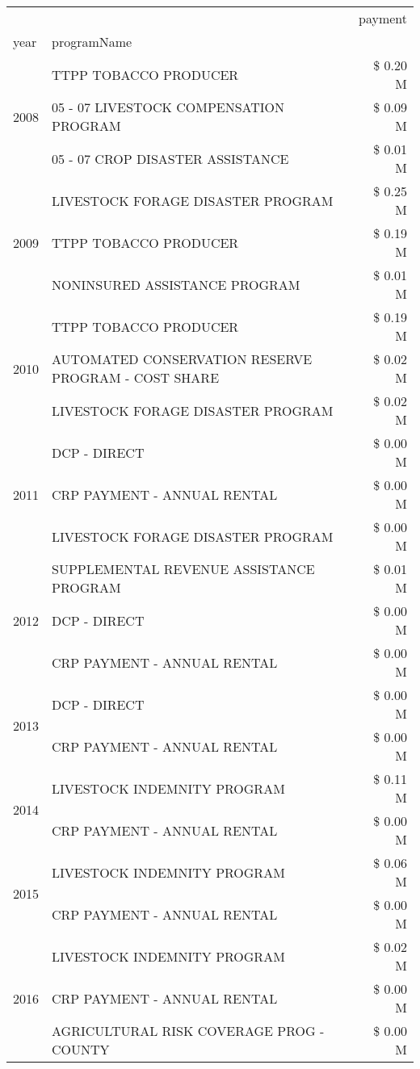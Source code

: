 \begin{tabular}{llr}
\toprule
 &  & payment \\
year & programName &  \\
\midrule
\multirow[t]{3}{*}{2008} & TTPP TOBACCO PRODUCER & \$ 0.20 M \\
 & 05 - 07 LIVESTOCK COMPENSATION PROGRAM & \$ 0.09 M \\
 & 05 - 07 CROP DISASTER ASSISTANCE & \$ 0.01 M \\
\cline{1-3}
\multirow[t]{3}{*}{2009} & LIVESTOCK FORAGE DISASTER  PROGRAM & \$ 0.25 M \\
 & TTPP TOBACCO PRODUCER & \$ 0.19 M \\
 & NONINSURED ASSISTANCE PROGRAM & \$ 0.01 M \\
\cline{1-3}
\multirow[t]{3}{*}{2010} & TTPP TOBACCO PRODUCER & \$ 0.19 M \\
 & AUTOMATED CONSERVATION RESERVE PROGRAM - COST SHARE & \$ 0.02 M \\
 & LIVESTOCK FORAGE DISASTER  PROGRAM & \$ 0.02 M \\
\cline{1-3}
\multirow[t]{3}{*}{2011} & DCP - DIRECT & \$ 0.00 M \\
 & CRP PAYMENT - ANNUAL RENTAL & \$ 0.00 M \\
 & LIVESTOCK FORAGE DISASTER PROGRAM & \$ 0.00 M \\
\cline{1-3}
\multirow[t]{3}{*}{2012} & SUPPLEMENTAL REVENUE ASSISTANCE PROGRAM & \$ 0.01 M \\
 & DCP - DIRECT & \$ 0.00 M \\
 & CRP PAYMENT - ANNUAL RENTAL & \$ 0.00 M \\
\cline{1-3}
\multirow[t]{2}{*}{2013} & DCP - DIRECT & \$ 0.00 M \\
 & CRP PAYMENT - ANNUAL RENTAL & \$ 0.00 M \\
\cline{1-3}
\multirow[t]{2}{*}{2014} & LIVESTOCK INDEMNITY PROGRAM & \$ 0.11 M \\
 & CRP PAYMENT - ANNUAL RENTAL & \$ 0.00 M \\
\cline{1-3}
\multirow[t]{2}{*}{2015} & LIVESTOCK INDEMNITY PROGRAM & \$ 0.06 M \\
 & CRP PAYMENT - ANNUAL RENTAL & \$ 0.00 M \\
\cline{1-3}
\multirow[t]{3}{*}{2016} & LIVESTOCK INDEMNITY PROGRAM & \$ 0.02 M \\
 & CRP PAYMENT - ANNUAL RENTAL & \$ 0.00 M \\
 & AGRICULTURAL RISK COVERAGE PROG - COUNTY & \$ 0.00 M \\

\end{tabular}
